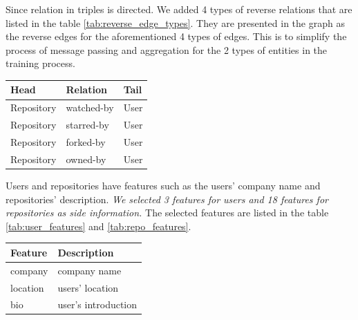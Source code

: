 \documentclass[11pt,twoside]{report}
\begin{document}
Since relation in triples is directed. We added 4 types of reverse relations that are listed in the table \ref{tab:reverse_edge_types}. They are presented in the graph as the reverse edges for the aforementioned 4 types of edges. This is to simplify the process of message passing and aggregation for the 2 types of entities in the training process.

\begin{center}
    \begin{tabular}{l | l | l}
    \hline
    Head & Relation & Tail \\
    \hline
    Repository & watched-by & User \\
    Repository & starred-by & User \\
    Repository & forked-by & User \\
    Repository & owned-by & User \\
    \end{tabular}
    \label{tab:reverse_edge_types}
\end{center}

Users and repositories have features such as the users' company name and repositories' description. \textit{We selected 3 features for users and 18 features for repositories as side information.} The selected features are listed in the table \ref{tab:user_features} and \ref{tab:repo_features}.

\begin{center}
    \begin{tabular}{l | l}
    \hline
    Feature & Description \\
    \hline
    company & company name \\
    location & users' location \\
    bio & user's introduction \\
    \end{tabular}
    \label{tab:user_features}
\end{center}
\end{document}
